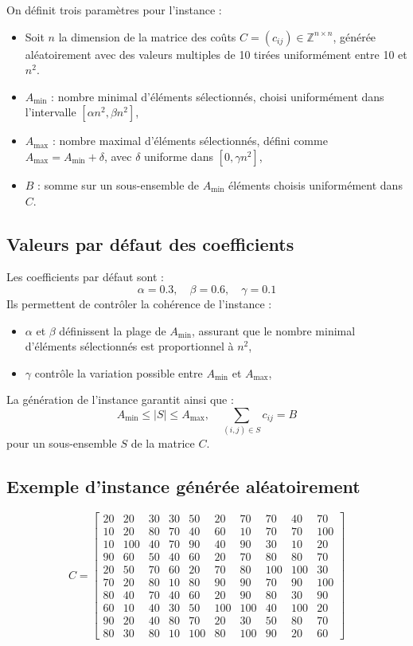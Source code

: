\documentclass[a4paper,11pt]{article}
\begin{document}
On définit trois paramètres pour l'instance : 
\begin{itemize}
    \item Soit $n$ la dimension de la matrice des coûts $C = (c_{ij}) \in \mathbb{Z}^{n \times n}$, générée aléatoirement avec des valeurs multiples de 10 tirées uniformément entre 10 et $n^2$.  
    \item $A_{\min}$ : nombre minimal d'éléments sélectionnés, choisi uniformément dans l'intervalle $[\alpha n^2, \beta n^2]$,
    \item $A_{\max}$ : nombre maximal d'éléments sélectionnés, défini comme $A_{\max} = A_{\min} + \delta$, avec $\delta$ uniforme dans $[0, \gamma n^2]$,
    \item $B$ : somme sur un sous-ensemble de $A_{\min}$ éléments choisis uniformément dans $C$.
\end{itemize}

\subsection*{Valeurs par défaut des coefficients}
Les coefficients par défaut sont :
\[
\alpha = 0.3, \quad
\beta = 0.6, \quad
\gamma = 0.1
\]
Ils permettent de contrôler la cohérence de l'instance :
\begin{itemize}
    \item $\alpha$ et $\beta$ définissent la plage de $A_{\min}$, assurant que le nombre minimal d'éléments sélectionnés est proportionnel à $n^2$,
    \item $\gamma$ contrôle la variation possible entre $A_{\min}$ et $A_{\max}$,
\end{itemize}

La génération de l'instance garantit ainsi que :
\[
A_{\min} \leq |S| \leq A_{\max}, \quad \sum_{(i,j) \in S} c_{ij} = B
\]
pour un sous-ensemble $S$ de la matrice $C$.

\subsection{ Exemple d'instance générée aléatoirement}


\[
C =
\begin{bmatrix}
20 & 20 & 30 & 30 & 50 & 20 & 70 & 70 & 40 & 70\\
10 & 20 & 80 & 70 & 40 & 60 & 10 & 70 & 70 & 100\\
10 & 100 & 40 & 70 & 90 & 40 & 90 & 30 & 10 & 20\\
90 & 60 & 50 & 40 & 60 & 20 & 70 & 80 & 80 & 70\\
20 & 50 & 70 & 60 & 20 & 70 & 80 & 100 & 100 & 30\\
70 & 20 & 80 & 10 & 80 & 90 & 90 & 70 & 90 & 100\\
80 & 40 & 70 & 40 & 60 & 20 & 90 & 80 & 30 & 90\\
60 & 10 & 40 & 30 & 50 & 100 & 100 & 40 & 100 & 20\\
90 & 20 & 40 & 80 & 70 & 20 & 30 & 50 & 80 & 70\\
80 & 30 & 80 & 10 & 100 & 80 & 100 & 90 & 20 & 60
\end{bmatrix}
\]
\end{document}
